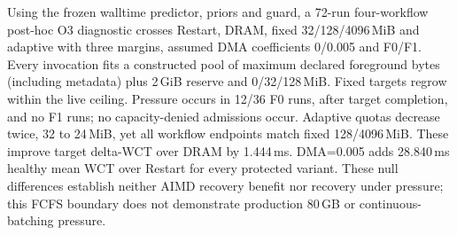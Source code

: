 Using the frozen walltime predictor, priors and guard, a 72-run four-workflow post-hoc O3
diagnostic crosses Restart, DRAM, fixed 32/128/4096\,MiB and adaptive with
three margins, assumed DMA coefficients 0/0.005 and F0/F1. Every invocation fits a constructed
pool of maximum declared foreground bytes (including metadata) plus
2\,GiB reserve and 0/32/128\,MiB.
Fixed targets regrow within the live ceiling. Pressure occurs in 12/36 F0
runs, after target completion, and no F1 runs; no capacity-denied admissions
occur. Adaptive quotas decrease twice, 32 to 24\,MiB, yet all workflow
endpoints match fixed 128/4096\,MiB. These improve target delta-WCT over DRAM
by 1.444\,ms. DMA=0.005 adds 28.840\,ms healthy mean WCT over Restart for
every protected variant. These null differences establish neither AIMD recovery benefit nor
recovery under pressure; this FCFS boundary does not demonstrate production
80\,GB or continuous-batching pressure.
